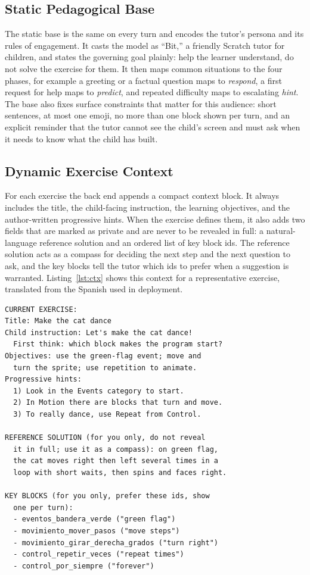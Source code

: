 \documentclass[conference]{IEEEtran}
\begin{document}
\subsection{Static Pedagogical Base}

The static base is the same on every turn and encodes the tutor's persona and its rules of engagement. It casts the model as ``Bit,'' a friendly Scratch tutor for children, and states the governing goal plainly: help the learner understand, do not solve the exercise for them. It then maps common situations to the four phases, for example a greeting or a factual question maps to \emph{respond}, a first request for help maps to \emph{predict}, and repeated difficulty maps to escalating \emph{hint}. The base also fixes surface constraints that matter for this audience: short sentences, at most one emoji, no more than one block shown per turn, and an explicit reminder that the tutor cannot see the child's screen and must ask when it needs to know what the child has built.

\subsection{Dynamic Exercise Context}

For each exercise the back end appends a compact context block. It always includes the title, the child-facing instruction, the learning objectives, and the author-written progressive hints. When the exercise defines them, it also adds two fields that are marked as private and are never to be revealed in full: a natural-language reference solution and an ordered list of key block ids. The reference solution acts as a compass for deciding the next step and the next question to ask, and the key blocks tell the tutor which ids to prefer when a suggestion is warranted. Listing~\ref{lst:ctx} shows this context for a representative exercise, translated from the Spanish used in deployment.

\begin{lstlisting}[style=promptbox, caption={Exercise context for a representative game (translated; block ids are verbatim).}, label={lst:ctx}]
CURRENT EXERCISE:
Title: Make the cat dance
Child instruction: Let's make the cat dance!
  First think: which block makes the program start?
Objectives: use the green-flag event; move and
  turn the sprite; use repetition to animate.
Progressive hints:
  1) Look in the Events category to start.
  2) In Motion there are blocks that turn and move.
  3) To really dance, use Repeat from Control.

REFERENCE SOLUTION (for you only, do not reveal
  it in full; use it as a compass): on green flag,
  the cat moves right then left several times in a
  loop with short waits, then spins and faces right.

KEY BLOCKS (for you only, prefer these ids, show
  one per turn):
  - eventos_bandera_verde ("green flag")
  - movimiento_mover_pasos ("move steps")
  - movimiento_girar_derecha_grados ("turn right")
  - control_repetir_veces ("repeat times")
  - control_por_siempre ("forever")
\end{lstlisting}
\end{document}
